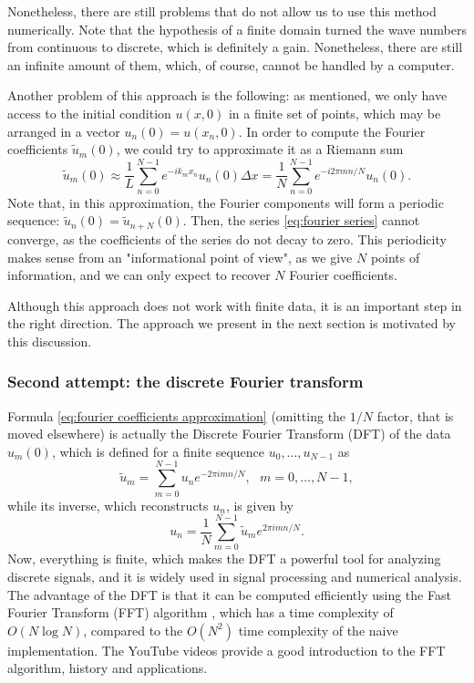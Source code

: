 \documentclass[openany,a4paper,oneside,11pt]{article}
\begin{document}
Nonetheless, there are still problems that do not allow us to use this method numerically. Note that the hypothesis of a finite domain turned the wave numbers from continuous to discrete, which is definitely a gain. Nonetheless, there are still an infinite amount of them, which, of course, cannot be handled by a computer.

Another problem of this approach is the following: as mentioned, we only have access to the initial condition $u(x,0)$ in a finite set of points, which may be arranged in a vector $u_n(0) = u(x_n,0)$. In order to compute the Fourier coefficients $\tilde{u}_m(0)$, we could try to approximate it as a Riemann sum
\begin{equation}
    \label{eq:fourier coefficients approximation}
    \tilde{u}_m(0) \approx \frac{1}{L} \sum_{n=0}^{N-1} e^{-i k_m x_n} u_n(0) \Delta x = \frac{1}{N} \sum_{n=0}^{N-1} e^{-i 2\pi mn/N} u_n(0).
\end{equation}
Note that, in this approximation, the Fourier components will form a periodic sequence: $\tilde{u}_n(0) = \tilde{u}_{n+N}(0)$. Then, the series \eqref{eq:fourier series} cannot converge, as the coefficients of the series do not decay to zero. This periodicity makes sense from an "informational point of view", as we give $N$ points of information, and we can only expect to recover $N$ Fourier coefficients.

Although this approach does not work with finite data, it is an important step in the right direction. The approach we present in the next section is motivated by this discussion.

\subsubsection{Second attempt: the discrete Fourier transform}

Formula \eqref{eq:fourier coefficients approximation} (omitting the $1/N$ factor, that is moved elsewhere) is actually the Discrete Fourier Transform (DFT) of the data $u_m(0)$, which is defined for a finite sequence $u_0, \ldots, u_{N-1}$ as
\begin{equation}
    \label{eq:dft}
    \tilde{u}_m = \sum_{m=0}^{N-1} u_n e^{-2\pi i mn/N}, \ \ \ m = 0, \ldots, N-1,
\end{equation}
while its inverse, which reconstructs $u_n$, is given by
\begin{equation}
    u_n = \frac{1}{N} \sum_{m=0}^{N-1} \tilde{u}_m e^{2\pi i mn/N}.
\end{equation}
Now, everything is finite, which makes the DFT a powerful tool for analyzing discrete signals, and it is widely used in signal processing and numerical analysis. The advantage of the DFT is that it can be computed efficiently using the Fast Fourier Transform (FFT) algorithm \cite{cooley1965algorithm}, which has a time complexity of $O(N \log N)$, compared to the $O(N^2)$ time complexity of the naive implementation. The YouTube videos \cite{fft_veritasium, fft_reducible} provide a good introduction to the FFT algorithm, history and applications.
\end{document}
